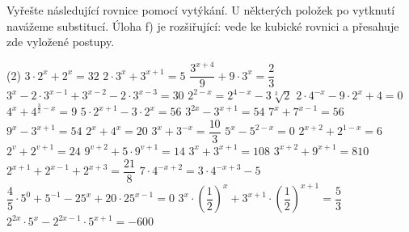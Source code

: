 \documentclass[12pt,a4paper]{article}
\begin{document}
\begin{exercise}
Vyřešte následující rovnice pomocí vytýkání.
U některých položek po vytknutí navážeme substitucí.
Úloha f) je rozšiřující: vede ke kubické rovnici a přesahuje zde vyložené postupy.

\begin{tasks}(2)
    \task $3 \cdot 2^{x} + 2^{x} = 32$                    %
    \task $2 \cdot 3^{x} + 3^{x+1} = 5$                   %
    \task $\dfrac{3^{x+4}}{9} + 9 \cdot 3^{x} = \dfrac{2}{3}$   %
    \task $3^{x} - 2 \cdot 3^{x-1} + 3^{x-2} - 2 \cdot 3^{x-3} = 30$  %
    \task $2^{2-x} = 2^{4-x} - 3\sqrt[3]{2}$              %
    \task $2 \cdot 4^{-x} - 9 \cdot 2^{x} + 4 = 0$        %
    \task $4^{x} + 4^{\frac{3}{2}-x} = 9$                %
    \task $5 \cdot 2^{x+1} - 3 \cdot 2^{x} = 56$          %
    \task $3^{2x} - 3^{x+1} = 54$                         %
    \task $7^{x} + 7^{x-1} = 56$                          %
    \task $9^{x} - 3^{x+1} = 54$                          %
    \task $2^{x} + 4^{x} = 20$                            %
    \task $3^{x} + 3^{-x} = \dfrac{10}{3}$                %
    \task $5^{x} - 5^{2-x} = 0$                           %
    \task $2^{x+2} + 2^{1-x} = 6$                         %
    \task $2^{v} + 2^{v+1} = 24$
    \task $9^{v+2} + 5\cdot9^{v+1} = 14$
    \task $3^{x} + 3^{x+1} = 108$
    \task $3^{x+2} + 9^{x+1} = 810$
    \task $2^{x+1} + 2^{x-1} + 2^{x+3} = \dfrac{21}{8}$
    \task $7 \cdot 4^{-x+2} = 3 \cdot 4^{-x+3} - 5$
    \task $\dfrac{4}{5} \cdot 5^{0} + 5^{-1} - 25^{x} + 20 \cdot 25^{x-1} = 0$
    \task $3^{x} \cdot \left(\dfrac{1}{2}\right)^{x} + 3^{x+1} \cdot \left(\dfrac{1}{2}\right)^{x+1} = \dfrac{5}{3}$
    \task $2^{2x} \cdot 5^{x} - 2^{2x-1} \cdot 5^{x+1} = -600$
\end{tasks}

\end{exercise}
\end{document}
